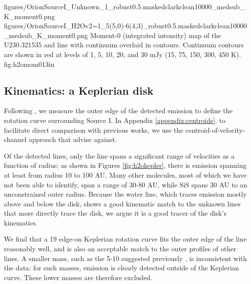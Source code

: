 \documentclass[twocolumn]{aastex61}
\begin{document}
\FigureTwo
{{figures/OrionSourceI_Unknown_1_robust0.5.maskedclarkclean10000_medsub_K_moment0}.png}
{{figures/OrionSourceI_H2Ov2=1_5(5,0)-6(4,3)_robust0.5.maskedclarkclean10000_medsub_K_moment0}.png}
{Moment-0 (integrated intensity) map of the U230.321535 and \water line with continuum overlaid
in contours.  Continuum contours are shown in red at levels of 1, 5, 10, 20, and 30
mJy \perbeam (15, 75, 150, 300, 450 K).
}
{fig:h2omom0}{1}{3in}

\subsection{Kinematics: a Keplerian disk}
\label{sec:kinematics}
Following \citet{Seifried2016a}, we measure the outer edge of the detected
emission to define the rotation curve surrounding Source I.  In Appendix
\ref{appendix:centroids}, to facilitate direct comparison with previous works,
we use the centroid-of-velocity-channel approach that \citet{Seifried2016a}
advise against.

Of the detected lines, only the \water line spans a significant range of
velocities as a function of radius; as shown in Figures \ref{fig:h2okepler},
there is \water emission spanning at least from radius 10 to 100 AU.  Many
other molecules, most of
which we have not been able to identify, span a range of 30-80 AU, while SiS
spans 30 AU to an unconstrained outer radius.  Because the water line,
which traces emission mostly above and below the disk, shows a good kinematic
match to the unknown lines that more directly trace the disk, we argue it is
a good tracer of the disk's kinematics.

We find that a 19 \msun edge-on Keplerian rotation curve fits the outer edge of
the \water line reasonably well, and is also an acceptable match to the outer
profiles of other lines.  A smaller mass, such as the 5-10 \msun suggested
previously \citep{Plambeck2016a,Hirota2014a}, is inconsistent with the data:
for such masses, emission is clearly detected outside of the Keplerian curve.
These lower masses are therefore excluded.  
\end{document}
